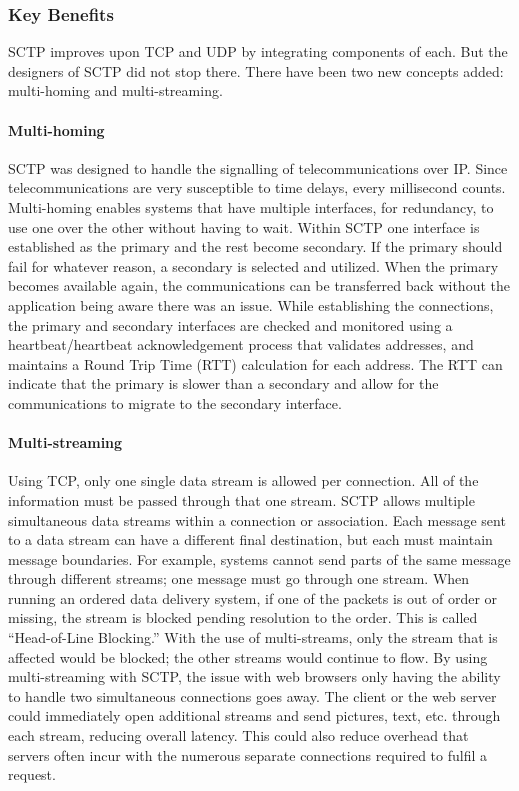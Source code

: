 \documentclass[a4paper]{article}
\begin{document}
\subsubsection{Key Benefits}
SCTP improves upon TCP and UDP by integrating components of each. But the designers of SCTP did not stop there. There have been two new concepts added: multi-homing and multi-streaming.

\paragraph{Multi-homing}
SCTP was designed to handle the signalling of telecommunications over IP. Since  telecommunications are very susceptible to time delays, every millisecond counts. Multi-homing enables systems that have multiple interfaces, for redundancy, to use one over the other without having to wait. Within SCTP one interface is established as the primary and the rest become secondary. If the primary should fail for whatever reason, a secondary is selected and utilized. When the primary becomes available again, the communications can be transferred back without the application being aware there was an issue. While establishing the connections, the primary and secondary interfaces are checked and monitored using a heartbeat/heartbeat  acknowledgement process that validates addresses, and maintains a Round Trip Time (RTT) calculation for each address. The RTT can indicate that the primary is slower than a secondary and allow for the communications to migrate to the secondary interface.

\paragraph{Multi-streaming}
Using TCP, only one single data stream is allowed per connection. All of the information must be passed through that one stream. SCTP allows multiple simultaneous data streams within a connection or association. Each message sent to a data stream can have a different final destination, but each must maintain message boundaries. For example, systems cannot send parts of the same message through different streams; one message must go through one stream. When running an ordered data delivery system, if one of the packets is out of order or missing, the stream is blocked pending resolution to the order. This is called “Head-of-Line Blocking.” With the use of multi-streams, only the stream that is affected would be blocked; the other streams would continue to flow. By using multi-streaming with SCTP, the issue with web browsers only having the ability to handle two simultaneous connections goes away. The client or the web server could immediately open additional streams and send pictures, text, etc. through each stream, reducing overall latency. This could also reduce overhead that servers often incur with the numerous separate connections required to fulfil a request.
\end{document}
